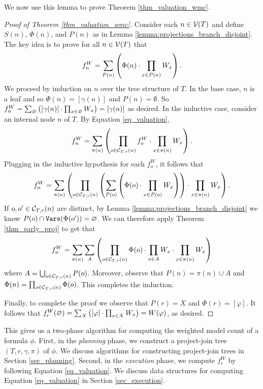 We now use this lemma to prove Theorem \ref{thm_valuation_wmc}.
\begin{proof}[Proof of Theorem \ref{thm_valuation_wmc}]
Consider each $n \in \mathcal{V}(T)$ and define $S(n)$, $\Phi(n)$, and $P(n)$ as in Lemma \ref{lemma:projections_branch_disjoint}. The key idea is to prove for all $n \in \mathcal{V}(T)$ that 
$$f^W_n = \sum_{P(n)} \left(  \Phi(n) \cdot \prod_{x \in P(n)} W_x  \right) \label{eqn:valuation:correctness}.$$
We proceed by induction on $n$ over the tree structure of $T$. In the base case, $n$ is a leaf and so $\Phi(n) = [\gamma(n)]$ and $P(n) = \emptyset$. So $f^W_n = \sum_{\varnothing} \left(  [\gamma(n)] \cdot \prod_{x \in \varnothing} W_x  \right) = [\gamma(n)]$ as desired. In the inductive case, consider an internal node $n$ of $T$. By Equation \ref{eq_valuation}, $$f^W_n = \sum_{\pi(n)} \left( \prod_{o \in \mathcal{C}_{T,r}(n)} f^W_o \cdot \prod_{x \in \pi(n)} W_x \right).$$
Plugging in the inductive hypothesis for each $f^W_o$, it follows that
$$f^W_n = \sum_{\pi(n)} \left( \prod_{o \in \mathcal{C}_{T,r}(n)} \left( \sum_{P(o)} \left(  \Phi(o) \cdot \prod_{x \in P(o)} W_{x}  \right)  \right) \cdot \prod_{x \in \pi(n)} W_{x} \right).$$
If $o, o' \in \mathcal{C}_{T,r}(n)$ are distinct, by Lemma \ref{lemma:projections_branch_disjoint} we know $P(o) \cap \texttt{\upshape Vars}(\Phi(o')) = \varnothing$. We can therefore apply Theorem \ref{thm_early_proj} to get that
$$f^W_n = \sum_{\pi(n)} \sum_{A} \left(  \prod_{o \in \mathcal{C}_{T,r}(n)} \Phi(o) \cdot \prod_{x \in A} W_{x} \cdot \prod_{x \in \pi(n)} W_{x}  \right)$$
where $A = \bigcup_{o \in \mathcal{C}_{T,r}(n)} P(o)$. Moreover, observe that $P(n) = \pi(n) \cup A$ and $\Phi(n) = \prod_{o \in \mathcal{C}_{T,r}(n)} \Phi(o)$. This completes the induction.

Finally, to complete the proof we observe that $P(r) = X$ and $\Phi(r) = [\varphi]$. It follows that $f^W_r(\varnothing) = \sum_X \left(  [\varphi] \cdot \prod_{x \in X} W_x  \right) = W(\varphi)$, as desired.
\end{proof}

This gives us a two-phase algorithm for computing the weighted model count of a formula $\phi$.
First, in the \emph{planning} phase, we construct a project-join tree $(T, r, \gamma, \pi)$ of $\phi$.
We discuss algorithms for constructing project-join trees in Section \ref{sec_planning}.
Second, in the \emph{execution} phase, we compute $f^W_r$ by following Equation \eqref{eq_valuation}.
We discuss data structures for computing Equation \eqref{eq_valuation} in Section \ref{sec_execution}.

